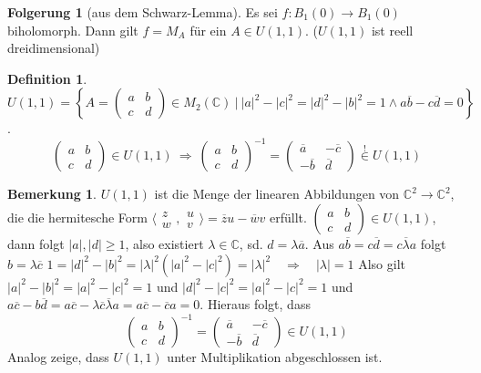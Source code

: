 \documentclass[11pt,titlepage]{article}
\theoremstyle{definition}
\newtheorem{corollary}[theorem]{Folgerung}
\newtheorem{definition}[theorem]{Definition}
\newtheorem{remark}{Bemerkung}
\theoremstyle{remark}
\begin{document}
	\begin{corollary}[aus dem Schwarz-Lemma]
		Es sei $f: B_1(0)\to B_1(0)$ biholomorph. Dann gilt $f=M_A$ für ein $A\in U(1,1)$. 
		($U(1,1)$ ist reell dreidimensional)
	\end{corollary}
	
	\begin{definition}
		$U(1,1)=\left\{ A=\left(\begin{smallmatrix} a&b\\c&d \end{smallmatrix}
		\right)\in M_2 (\mathbb{C})\  \vert\  |a|^2 -|c|^2 =|d|^2 -|b|^2 =1 \land a\overline{b}-c\overline{d}=0 
		\right\}$.
		\[ \begin{pmatrix}a&b\\c&d\end{pmatrix}\in U(1,1)\ \Rightarrow\ 
		\begin{pmatrix}a&b\\c&d\end{pmatrix}^{-1}=\begin{pmatrix}\overline{a}&-\overline{c} \\
		-\overline{b}&\overline{d}\end{pmatrix}\overset{!}{\in}U(1,1) \]
	\end{definition}
	
	\begin{remark}
		$U(1,1)$ ist die Menge der linearen Abbildungen von $\mathbb{C}^2\to\mathbb{C}^2$, 
		die die hermitesche Form $\langle \begin{smallmatrix}z\\w\end{smallmatrix},
		\begin{smallmatrix}u\\v\end{smallmatrix}\rangle =\overline{z}u-\overline{w}v$ erfüllt. 
		$\left( \begin{smallmatrix}a&b\\c&d\end{smallmatrix} \right) \in U(1,1)$, dann folgt 
		$|a|,|d|\geq 1$, also existiert $\lambda\in\mathbb{C}$, sd. $d=\lambda\overline{a}$. 
		Aus $a\overline{b}=c\overline{d}=c\overline{\lambda} a$ folgt $b=\lambda\overline{c}$ 
		$1=|d|^2 -|b|^2 =|\lambda |^2 (|a|^2 -|c|^2 )=|\lambda |^2 \quad \Rightarrow \quad |\lambda|=1$ 
		Also gilt $|a|^2 -|b|^2 =|a|^2 -|c|^2 =1$ und $|d|^2 -|c|^2 =|a|^2 -|c|^2 =1$ und $a\overline{c} -
		b\overline{d}=a\overline{c} -\lambda \overline{c}\overline{\lambda}a=a\overline{c} - 
		\overline{c}a=0$. 
		Hieraus folgt, dass 
		\[ \begin{pmatrix} a&b \\ c&d \end{pmatrix}^{-1} = \begin{pmatrix} \overline{a} & -\overline{c} \\
		-\overline{b} & \overline{d} \end{pmatrix} \in U(1,1) \]
		Analog zeige, dass $U(1,1)$ unter Multiplikation abgeschlossen ist.
	\end{remark}
	
\end{document}
